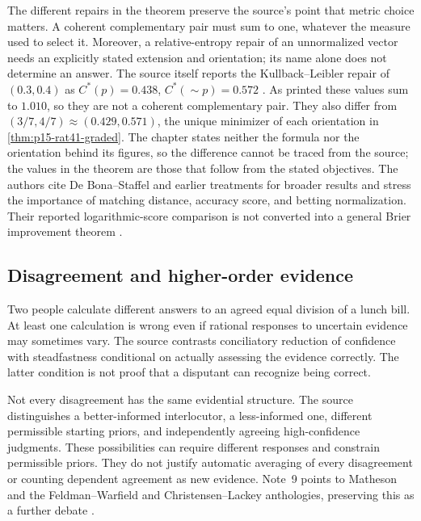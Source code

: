 The different repairs in the theorem preserve the source's point that
metric choice matters. A coherent complementary pair must sum to one,
whatever the measure used to select it. Moreover, a relative-entropy
repair of an unnormalized vector needs an explicitly stated extension
and orientation; its name alone does not determine an answer.
The source itself reports the Kullback--Leibler repair of
\((0.3,0.4)\) as \(C^*(p)=0.438\), \(C^*({\sim}p)=0.572\)
\parencite[p.~247]{HajekStaffel2021Dynamics}. As printed these values
sum to \(1.010\), so they are not a coherent complementary pair. They
also differ from \((3/7,4/7)\approx(0.429,0.571)\), the unique
minimizer of each orientation in \cref{thm:p15-rat41-graded}. The
chapter states neither the formula nor the orientation behind its
figures, so the difference cannot be traced from the source; the
values in the theorem are those that follow from the stated
objectives.
The authors cite De Bona--Staffel and earlier treatments
for broader results and stress the importance of matching distance,
accuracy score, and betting normalization. Their reported logarithmic-score
comparison is not converted into a general Brier improvement theorem
\parencite[pp.~246--247]{HajekStaffel2021Dynamics}.

\subsection{Disagreement and higher-order evidence}

Two people calculate different answers to an agreed equal division of
a lunch bill. At least one calculation is wrong even if rational
responses to uncertain evidence may sometimes vary. The source
contrasts conciliatory reduction of confidence with steadfastness
conditional on actually assessing the evidence correctly. The latter
condition is not proof that a disputant can recognize being correct.

Not every disagreement has the same evidential structure. The source
distinguishes a better-informed interlocutor, a less-informed one,
different permissible starting priors, and independently agreeing
high-confidence judgments. These possibilities can require different
responses and constrain permissible priors. They do not justify automatic
averaging of every disagreement or counting dependent agreement as new
evidence. Note~9 points to Matheson and the Feldman--Warfield and
Christensen--Lackey anthologies, preserving this as a further debate
\parencite[p.~247 and p.~248, n.~9]{HajekStaffel2021Dynamics}.

